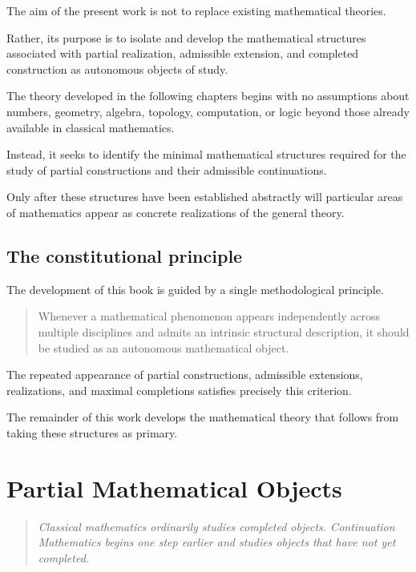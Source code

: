 \documentclass[13pt,openany]{book}
\theoremstyle{plain}
\theoremstyle{definition}
\begin{document}
The aim of the present work is not to replace existing mathematical theories.

Rather, its purpose is to isolate and develop the mathematical structures
associated with partial realization, admissible extension, and completed
construction as autonomous objects of study.

The theory developed in the following chapters begins with no assumptions about
numbers, geometry, algebra, topology, computation, or logic beyond those
already available in classical mathematics.

Instead, it seeks to identify the minimal mathematical structures required for
the study of partial constructions and their admissible continuations.

Only after these structures have been established abstractly will particular
areas of mathematics appear as concrete realizations of the general theory.


\section{The constitutional principle}

The development of this book is guided by a single methodological principle.

\begin{quote}
Whenever a mathematical phenomenon appears independently across multiple
disciplines and admits an intrinsic structural description, it should be studied
as an autonomous mathematical object.
\end{quote}

The repeated appearance of partial constructions, admissible extensions,
realizations, and maximal completions satisfies precisely this criterion.

The remainder of this work develops the mathematical theory that follows from
taking these structures as primary.

\chapter{Partial Mathematical Objects}

\begin{quote}
\emph{Classical mathematics ordinarily studies completed objects.
Continuation Mathematics begins one step earlier and studies objects
that have not yet completed.}
\end{quote}
\end{document}
